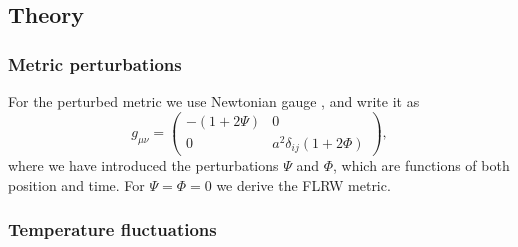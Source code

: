 \subsection{Theory}\label{ssec:M3:theory}
\subsubsection{Metric perturbations}\label{sssec:M3:theory:metric_perturbations}
For the perturbed metric we use Newtonian gauge , and write it as  
\begin{equation}
    g_{\mu\nu} = 
    \begin{pmatrix}
        -(1+2\Psi) & 0 \\
        0 & a^2 \delta_{ij}(1+2\Phi)
    \end{pmatrix},
\end{equation}
where we have introduced the perturbations $\Psi$ and $\Phi$, which are functions of both position and time. For $\Psi=\Phi=0$ we derive the FLRW metric. 


\subsubsection{Temperature fluctuations}\label{sssec:M3:theory:temperature_fluctuations}



